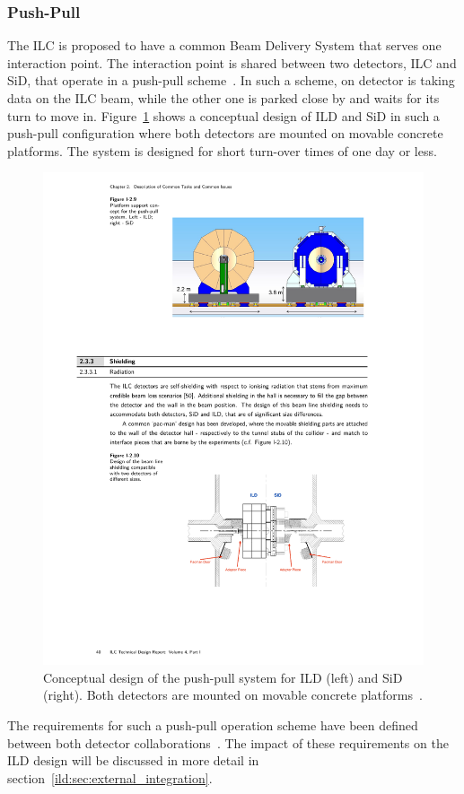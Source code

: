\subsubsection{Push-Pull}
The ILC is proposed to have a common Beam Delivery System that serves one interaction point. The interaction point is shared between two detectors, ILC and SiD, that operate in a push-pull scheme~\cite{Behnke:2013xla}. In such a scheme, on detector is taking data on the ILC beam, while the other one is parked close by and waits for its turn to move in. Figure~\ref{ild:fig:push_pull} shows a conceptual design of ILD and SiD in such a push-pull configuration where both detectors are mounted on movable concrete platforms. The system is designed for short turn-over times of one day or less.
\begin{figure}[h!]
\centering
\includegraphics[width=0.8\hsize]{ILC/figs/push-pull.pdf}
\caption{\label{ild:fig:push_pull}Conceptual design of the push-pull system for ILD (left) and SiD (right). Both detectors are mounted on movable concrete platforms~\cite{Behnke:2013xla}.}
\end{figure}
The requirements for such a push-pull operation scheme have been defined between both detector collaborations~\cite{Parker:2009zz}. The impact of these requirements on the ILD design will be discussed in more detail in section~\ref{ild:sec:external_integration}.

